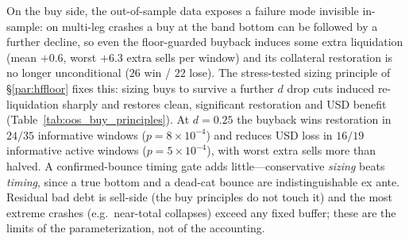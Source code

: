 \documentclass[12pt]{article}
\begin{document}

On the buy side, the out-of-sample data exposes a failure mode invisible in-sample: on multi-leg crashes a buy at the band bottom can be followed by a further decline, so even the floor-guarded buyback induces some extra liquidation (mean $+0.6$, worst $+6.3$ extra sells per window) and its collateral restoration is no longer unconditional ($26$ win / $22$ lose). The stress-tested sizing principle of \S\ref{par:hffloor} fixes this: sizing buys to survive a further $d$ drop cuts induced re-liquidation sharply and restores clean, significant restoration and USD benefit (Table~\ref{tab:oos_buy_principles}). At $d=0.25$ the buyback wins restoration in $24/35$ informative windows ($p=8\times10^{-4}$) and reduces USD loss in $16/19$ informative active windows ($p=5\times10^{-4}$), with worst extra sells more than halved. A confirmed-bounce timing gate adds little---conservative \emph{sizing} beats \emph{timing}, since a true bottom and a dead-cat bounce are indistinguishable ex ante. Residual bad debt is sell-side (the buy principles do not touch it) and the most extreme crashes (e.g.\ near-total collapses) exceed any fixed buffer; these are the limits of the parameterization, not of the accounting.

\end{document}
